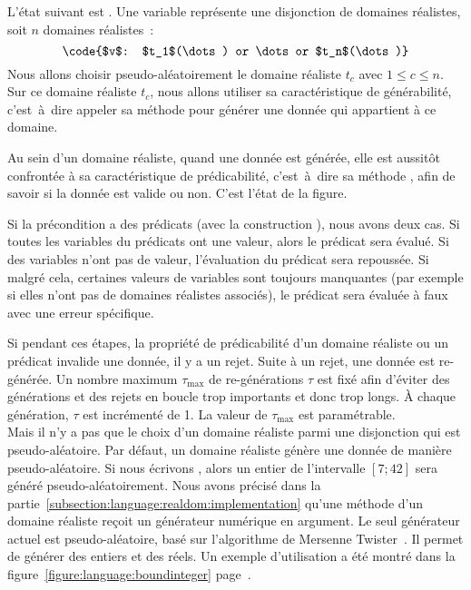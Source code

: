 L'état suivant est . Une variable représente une disjonction de
domaines réalistes, soit $n$ domaines réalistes~:
%
$$\code{$v$: $t_1$(\dots) or \dots or $t_n$(\dots)}$$
%
Nous allons choisir pseudo-aléatoirement le domaine réaliste $t_c$ avec $1 \leq
c \leq n$. Sur ce domaine réaliste $t_c$, nous allons utiliser sa
caractéristique de générabilité, c'est~à~dire appeler sa méthode 
pour générer une donnée qui appartient à ce domaine.

Au sein d'un domaine réaliste, quand une donnée est générée, elle est aussitôt
confrontée à sa caractéristique de prédicabilité, c'est~à~dire sa méthode
, afin de savoir si la donnée est valide ou non. C'est l'état
 de la figure.

Si la précondition a des prédicats (avec la construction ), nous avons
deux cas. Si toutes les variables du prédicats ont une valeur, alors le prédicat
sera évalué. Si des variables n'ont pas de valeur, l'évaluation du prédicat sera
repoussée. Si malgré cela, certaines valeurs de variables sont toujours
manquantes (par exemple si elles n'ont pas de domaines réalistes associés), le
prédicat sera évaluée à faux avec une erreur spécifique.

Si pendant ces étapes, la propriété de prédicabilité d'un domaine réaliste ou un
prédicat invalide une donnée, il y a un {\strong rejet}. Suite à un rejet, une
donnée est re-générée. Un nombre maximum $\tau_\mathrm{max}$ de re-générations
$\tau$ est fixé afin d'éviter des générations et des rejets en boucle trop
importants et donc trop longs. À chaque génération, $\tau$ est incrémenté de 1.
La valeur de $\tau_\mathrm{max}$ est paramétrable. \\

Mais il n'y a pas que le choix d'un domaine réaliste parmi une disjonction qui
est pseudo-aléatoire. Par défaut, un domaine réaliste génère une donnée de
manière pseudo-aléatoire.  Si nous écrivons , alors un
entier de l'intervalle $[7; 42]$ sera généré pseudo-aléatoirement. Nous avons
précisé dans la partie~\ref{subsection:language:realdom:implementation} qu'une
méthode  d'un domaine réaliste reçoit un générateur numérique en
argument. Le seul générateur actuel est pseudo-aléatoire, basé sur l'algorithme
de Mersenne Twister~. Il permet de générer des entiers et
des réels. Un exemple d'utilisation a été montré dans la
figure~\ref{figure:language:boundinteger}
page~\pageref{figure:language:boundinteger}.

